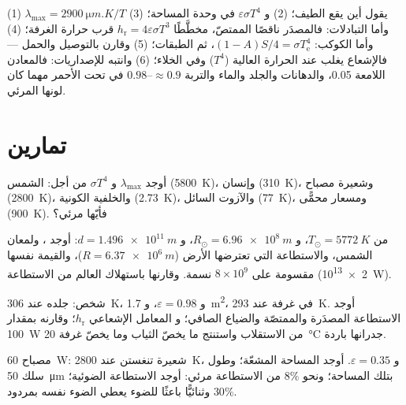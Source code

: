 \begin{method}\label{meth:b2:thermal-radiation:method}
(1) $\lambda_{\max} = \qty{2900}{\micro m.K}/T$ يقول أين يقع
الطيف؛ (2) و $\varepsilon\sigma T^4$ في وحدة المساحة؛ (3) وأما التبادلات: فالمصدَر
ناقصًا الممتصّ، مخطَّطًا $h_{\text{r}} = 4\varepsilon\sigma T^3$ قرب
حرارة الغرفة؛ (4) وأما الكوكب: $(1 - A)S/4 = \sigma T_{\text{e}}^4$، ثم
الطبقات؛ (5) وقارن بالتوصيل والحمل --- فالإشعاع
يغلب عند الحرارة العالية ($T^4$) وفي الخلاء؛ (6) وانتبه للإصداريات:
فالمعادن اللامعة \qty{0.05}{}، والدهانات والجلد والماء والتربة $\approx 0.9$--$0.98$
في تحت الأحمر مهما كان لونها المرئي.
\end{method}

\section{تمارين}

\begin{exercise}[$\star$]\label{exo:b2:thermal-radiation:1}
أوجد $\lambda_{\max}$ و $\sigma T^4$ من أجل: الشمس (\qty{5800}{K})، وإنسان
(\qty{310}{K})، وشعيرة مصباح (\qty{2800}{K})، والخلفية الكونية
(\qty{2.73}{K})، والآزوت السائل (\qty{77}{K})، ومسعار محمًّى
(\qty{900}{K}). فأيّها مرئي؟
\end{exercise}

\begin{exercise}[$\star$]\label{exo:b2:thermal-radiation:2}
من $T_\odot = \qty{5772}{K}$، و $R_\odot = \qty{6.96e8}{m}$، و $d = \qty{1.496e11}{m}$:
أوجد ، ولمعان الشمس، والاستطاعة التي تعترضها
الأرض ($R = \qty{6.37e6}{m}$)، والقيمة نفسها مقسومة على $8 \times 10^9$
نسمة. وقارنها باستهلاك العالم من الاستطاعة (\qty{2e13}{W}).
\end{exercise}

\begin{exercise}[$\star$]\label{exo:b2:thermal-radiation:3}
شخص: جلده عند \qty{306}{K}، و $\varepsilon = 0.98$، و \qty{1.7}{m^2}، في
غرفة عند \qty{293}{K}. أوجد الاستطاعة المصدَرة والممتصّة والضياع الصافي؛ و
المعامل الإشعاعي $h_{\text{r}}$؛ وقارنه بمقدار \qty{100}{W} من
الاستقلاب واستنتج ما يخصّ الثياب وما يخصّ غرفة \qty{20}{\celsius}
جدرانها باردة.
\end{exercise}

\begin{exercise}[$\star$]\label{exo:b2:thermal-radiation:4}
مصباح \qty{60}{W}: شعيرة تنغستن عند \qty{2800}{K}، و $\varepsilon = 0.35$.
أوجد المساحة المشعّة؛ وطول سلك \qty{50}{\micro m} بتلك المساحة؛
ونحو $8\%$ من الاستطاعة مرئي: أوجد الاستطاعة الضوئية؛ وثنائيًّا باعثًا للضوء يعطي
الضوء نفسه بمردود $30\%$.
\end{exercise}

